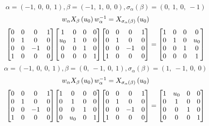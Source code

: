 \documentclass[11pt]{article}
\theoremstyle{definition}
\begin{document}
\[
\alpha = \left( -1, \  0, \  0, \  1\right), \beta = \left( -1, \  1, \  0, \  0\right), \sigma_{\alpha}(\beta) = \left( 0, \  1, \  0, \  -1\right)
\]
\[
\scaletoalign{\textwidth}{w_{\alpha} X_{\beta}\left(u_{0}\right) w_{\alpha}^{-1} = X_{\sigma_{\alpha}\left(\beta\right)}\left(u_{0}\right)}
\]
\[
\scaletoalign{\textwidth}{{\left[\begin{matrix}0 & 0 & 0 & 1\\0 & 1 & 0 & 0\\0 & 0 & -1 & 0\\1 & 0 & 0 & 0\end{matrix}\right]} {\left[\begin{matrix}1 & 0 & 0 & 0\\u_{0} & 1 & 0 & 0\\0 & 0 & 1 & 0\\0 & 0 & 0 & 1\end{matrix}\right]} {\left[\begin{matrix}0 & 0 & 0 & 1\\0 & 1 & 0 & 0\\0 & 0 & -1 & 0\\1 & 0 & 0 & 0\end{matrix}\right]} = {\left[\begin{matrix}1 & 0 & 0 & 0\\0 & 1 & 0 & u_{0}\\0 & 0 & 1 & 0\\0 & 0 & 0 & 1\end{matrix}\right]}}
\]
\[
\alpha = \left( -1, \  0, \  0, \  1\right), \beta = \left( 0, \  -1, \  0, \  1\right), \sigma_{\alpha}(\beta) = \left( 1, \  -1, \  0, \  0\right)
\]
\[
\scaletoalign{\textwidth}{w_{\alpha} X_{\beta}\left(u_{0}\right) w_{\alpha}^{-1} = X_{\sigma_{\alpha}\left(\beta\right)}\left(u_{0}\right)}
\]
\[
\scaletoalign{\textwidth}{{\left[\begin{matrix}0 & 0 & 0 & 1\\0 & 1 & 0 & 0\\0 & 0 & -1 & 0\\1 & 0 & 0 & 0\end{matrix}\right]} {\left[\begin{matrix}1 & 0 & 0 & 0\\0 & 1 & 0 & 0\\0 & 0 & 1 & 0\\0 & u_{0} & 0 & 1\end{matrix}\right]} {\left[\begin{matrix}0 & 0 & 0 & 1\\0 & 1 & 0 & 0\\0 & 0 & -1 & 0\\1 & 0 & 0 & 0\end{matrix}\right]} = {\left[\begin{matrix}1 & u_{0} & 0 & 0\\0 & 1 & 0 & 0\\0 & 0 & 1 & 0\\0 & 0 & 0 & 1\end{matrix}\right]}}
\]
\end{document}
